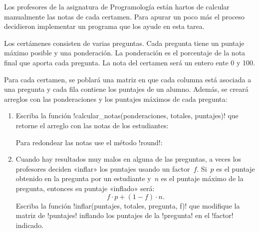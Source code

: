 Los profesores de la asignatura de Programología están hartos
de calcular manualmente las notas de cada certamen.
Para apurar un poco más el proceso
decidieron implementar un programa que los ayude en esta tarea.

Los certámenes consisten de varias preguntas.
Cada pregunta tiene un puntaje máximo posible y una ponderación.
La ponderación es el porcentaje de la nota final
que aporta cada pregunta.
La nota del certamen será un entero ente 0 y 100.

Para cada certamen,
se poblará una matriz en que cada columna está asociada a una pregunta
y cada fila contiene los puntajes de un alumno.
Además,
se creará arreglos con las ponderaciones y los puntajes máximos
de cada pregunta:



\begin{enumerate}[leftmargin=0pt,label=\emph{\alph*})]

  \item
    Escriba la función \li!calcular_notas(ponderaciones, totales, puntajes)!
    que retorne el arreglo con las notas de los estudiantes:
    

    Para redondear las notas use el método \li!round!:
    

  \item
    Cuando hay resultados muy malos en alguna de las preguntas,
    a veces los profesores deciden «inflar» los puntajes
    usando un factor~\(f\).
    Si~\(p\) es el puntaje obtenido en la pregunta por un estudiante
    y~\(n\) es el puntaje máximo de la pregunta,
    entonces su puntaje «inflado» será:
    \[
        f\cdot p + (1 - f)\cdot n.
    \]
    Escriba la función \li!inflar(puntajes, totales, pregunta, f)!
    que modifique la matriz de \li!puntajes!
    inflando los puntajes de la \li!pregunta!
    en el \li!factor! indicado.
    

\end{enumerate}

